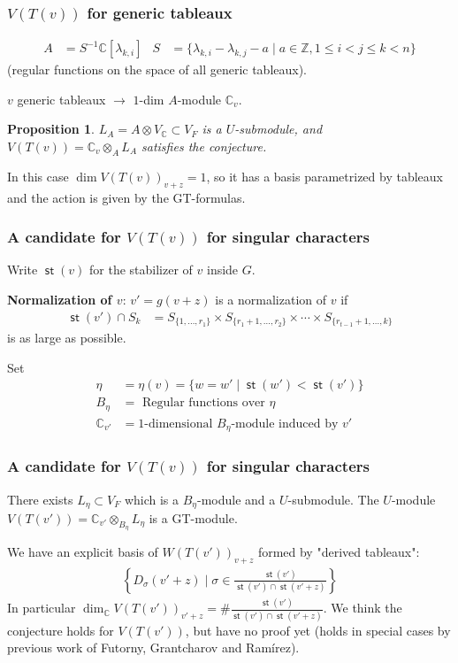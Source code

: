 \documentclass[smaller,usepdftitle=false]{beamer}
\newcommand\CC{\mathbb C}
\newcommand\ZZ{\mathbb Z}
\newcommand\ot{\otimes}
\DeclareMathOperator\st{\mathsf{st}}
\newtheorem*{Proposition}{Proposition}
\def\pausa{\pause \bigskip}
\begin{document}
\begin{frame}
\frametitle{$V(T(v))$ for generic tableaux}
\begin{align*}
A &= S^{-1} \CC[\lambda_{k,i}] &
S 
  &= \{\lambda_{k,i} - \lambda_{k,j} - a \mid a \in \ZZ, 
    1 \leq i < j \leq k < n\}
\end{align*}
(regular functions on the space of all generic tableaux).
\pausa 

$v$ generic tableaux $\longrightarrow$ $1$-dim $A$-module $\CC_v$.

\begin{Proposition}
$L_A = A \ot V_\CC \subset V_F$ is a $U$-submodule, and $V(T(v)) = \CC_v 
\ot_A L_A$ satisfies the conjecture. 
\end{Proposition}
In this case $\dim V(T(v))_{v+z} = 1$, so it has a basis parametrized by 
tableaux and the action is given by the GT-formulas.
\end{frame}

\begin{frame}
\frametitle{A candidate for $V(T(v))$ for singular characters}
Write $\st(v)$ for the stabilizer of $v$ inside $G$.

\textbf{Normalization of $v$}:
$v' = g(v+z)$ is a normalization of $v$ if 
\begin{align*}
\st(v') \cap S_k &= S_{\{1, \ldots, r_1\}} \times S_{\{r_1 + 1, \ldots, r_2\}}
  \times \cdots \times S_{\{r_{t-1}+1, \ldots, k\}}
\end{align*}
is as large as possible. 
\pausa

Set
\begin{align*}
\eta &= \eta(v) =\{w = w' \mid \st(w') < \st(v')\} \\
B_\eta &= \mbox{ Regular functions over $\eta$} \\
\CC_{v'} &= \mbox{$1$-dimensional $B_\eta$-module induced by $v'$}
\end{align*}
\end{frame}

\begin{frame}
\frametitle{A candidate for $V(T(v))$ for singular characters}
\begin{Theorem}[Ramírez, Z' - 17]
There exists $L_\eta \subset V_F$ which is a $B_\eta$-module and a 
$U$-submodule. The $U$-module $V(T(v')) = \CC_{v'} \ot_{B_\eta} L_\eta$ is a 
GT-module.
\end{Theorem}

We have an explicit basis of $W(T(v'))_{v+z}$ formed by "derived tableaux":
\begin{align*}
\left\{D_\sigma(v'+z) \mid \sigma \in \frac{\st(v')}{\st(v') 
\cap \st(v'+z)} \right\}
\end{align*}
In particular $\dim_\CC V(T(v'))_{v'+z} = \# \frac{\st(v')}{\st(v') 
\cap \st(v'+z)}$. We think the conjecture holds for $V(T(v'))$, but have no 
proof yet (holds in special cases by previous work of Futorny, Grantcharov and 
Ramírez).
\end{frame}
\end{document}
